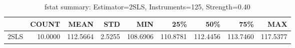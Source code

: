 \begin{table}[ht]
\centering
\caption{fstat summary: Estimator=2SLS, Instruments=125, Strength=0.40}
\begin{tabular}{lrrrrrrrr}
\toprule
 & COUNT & MEAN & STD & MIN & 25\% & 50\% & 75\% & MAX \\
\midrule
2SLS & 10.0000 & 112.5664 & 2.5255 & 108.6906 & 110.8781 & 112.4456 & 113.7460 & 117.5377 \\
\bottomrule
\end{tabular}
\end{table}
